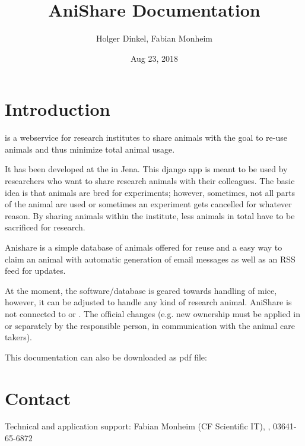\documentclass[letterpaper,10pt,openany,oneside,english]{sphinxmanual}
\title{AniShare Documentation}
\date{Aug 23, 2018}
\author{Holger Dinkel, Fabian Monheim}
\begin{document}
\maketitle
\sphinxtableofcontents
{}\label{\detokenize{index::doc}}



\chapter{Introduction}
\label{\detokenize{index:introduction}}
 is a webservice for research institutes to share animals with the goal to re-use
animals and thus minimize total animal usage.

It has been developed at the  in
Jena. This django app is meant to be used by researchers who want to share research animals with
their colleagues. The basic idea is that animals are bred for experiments; however, sometimes, not
all parts of the animal are used or sometimes an experiment gets cancelled for whatever reason. By
sharing animals within the institute, less animals in total have to be sacrificed for research.

Anishare is a simple database of animals offered for reuse and a easy way to claim an animal with
automatic generation of email messages as well as an RSS feed for updates.

\noindent{}

At the moment, the software/database is geared towards handling of mice, however, it can be adjusted
to handle any kind of research animal. AniShare is not connected to  or .
The official changes (e.g. new ownership must be applied in  or  separately by the responsible person, in communication with the animal care takers).

This documentation can also be downloaded as pdf file: 


\chapter{Contact}
\label{\detokenize{index:contact}}
Technical and application support: Fabian Monheim (CF Scientific IT), , 03641-65-6872
\end{document}
